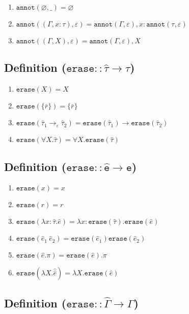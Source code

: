 \documentclass{llncs}
\newcommand{\keywadj}[1]{\mathtt{#1}}
\newcommand{\kwa}[1]{\keywadj{ #1 }}
\newcommand{\erase}[1]{
	\keywadj{erase}(#1)
}
\begin{document}
\begin{enumerate}
	\item $\kwa{annot}(\varnothing, \_) = \varnothing$
	\item $\kwa{annot}((\Gamma, x: \tau), \varepsilon) = \kwa{annot}(\Gamma, \varepsilon), x: \kwa{annot}(\tau, \varepsilon)$
	\item $\kwa{annot}((\Gamma, X), \varepsilon) = \kwa{annot}(\Gamma, \varepsilon), X$
\end{enumerate}

\subsection*{Definition ($\kwa{erase :: \hat \tau \rightarrow \tau}$)}

\begin{enumerate}
	\item $\erase{X} = X$
	\item $\erase{\{ \bar r \}} = \{ \bar r \}$
	\item $\kwa{erase}(\hat \tau_1 \rightarrow_{\varepsilon} \hat \tau_2) = \kwa{erase}(\hat \tau_1) \rightarrow \kwa{erase}(\hat \tau_2)$
	\item $\erase{\forall X. \hat \tau} = \forall X. \erase{\hat \tau}$
\end{enumerate}

\subsection*{Definition ($\kwa{erase :: \hat e \rightarrow e}$)}

\begin{enumerate}
	\item $\kwa{erase}(x) = x$
	\item $\kwa{erase}(r) = r$
	\item $\kwa{erase}(\lambda x: \hat \tau.\hat e) = \lambda x: \kwa{erase}(\hat \tau).\kwa{erase}(\hat e)$
	\item $\kwa{erase}(\hat e_1~\hat e_2) = \kwa{erase}(\hat e_1) \kwa{erase}(\hat e_2)$
	\item $\kwa{erase}(\hat e.\pi) = \kwa{erase}(\hat e).\pi$
	\item $\erase{\lambda X. \hat \hat e} = \lambda X. \erase{\hat e}$
\end{enumerate}


\subsection*{Definition ($\kwa{erase :: \hat \Gamma \rightarrow \Gamma}$)}
\end{document}
